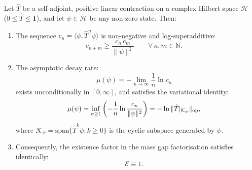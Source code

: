 \begin{theorem}
\label{thm:unconditional_existence_rate}
Let $\hat{T}$ be a self-adjoint, positive linear contraction on a complex Hilbert space $\mathcal{H}$ ($0 \le \hat{T} \le \mathbf{1}$), and let $\psi \in \mathcal{H}$ be any non-zero state. Then:
\begin{enumerate}
    \item The sequence $c_n = \langle \psi, \hat{T}^n \psi \rangle$ is non-negative and log-superadditive:
    \begin{equation}
    \label{eq:superadditivity_log}
    c_{n+m} \ge \frac{c_n \, c_m}{\|\psi\|^2} \qquad \forall \, n, m \in \mathbb{N}.
    \end{equation}
    \item The asymptotic decay rate:
    \begin{equation}
    \label{eq:mu_psi_limit}
    \mu(\psi) = -\lim_{n \to \infty} \frac{1}{n} \ln c_n
    \end{equation}
    exists unconditionally in $[0, \infty]$, and satisfies the variational identity:
    \begin{equation}
    \label{eq:ch9_variational_identity}
    \mu(\psi) = \inf_{n \ge 1} \left( -\frac{1}{n} \ln \frac{c_n}{\|\psi\|^2} \right) = -\ln \|\hat{T}|_{\mathcal{K}_\psi}\|_{\mathrm{op}},
    \end{equation}
    where $\mathcal{K}_\psi = \overline{\mathrm{span}\{\hat{T}^k \psi : k \ge 0\}}$ is the cyclic subspace generated by $\psi$.
    \item Consequently, the existence factor in the mass gap factorisation satisfies identically:
    \begin{equation}
    \mathcal{E} \equiv 1.
    \end{equation}
\end{enumerate}
\end{theorem}

